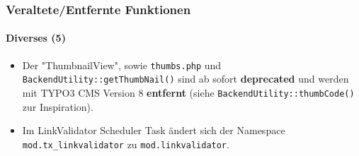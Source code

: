 \begin{frame}[fragile]
	\frametitle{Veraltete/Entfernte Funktionen}
	\framesubtitle{Diverses (5)}

	\lstset{basicstyle=\tiny\ttfamily}

	\begin{itemize}

		\item Der "ThumbnailView", sowie \texttt{thumbs.php} und \texttt{BackendUtility::getThumbNail()}
			sind ab sofort \textbf{deprecated} und werden mit TYPO3 CMS Version 8 \textbf{entfernt}\newline
			(siehe \texttt{BackendUtility::thumbCode()} zur Inspiration).

		\item Im LinkValidator Scheduler Task ändert sich der Namespace
			\texttt{mod.tx\_linkvalidator} zu \texttt{mod.linkvalidator}.

	\end{itemize}

\end{frame}

